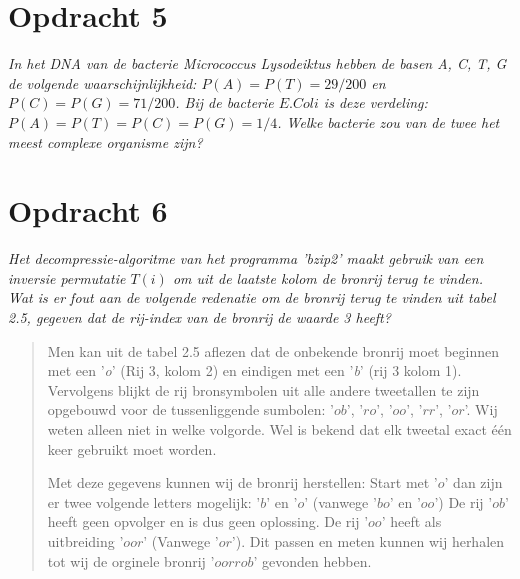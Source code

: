 \section{Opdracht 5}
\emph{In het DNA van de bacterie \emph{Micrococcus Lysodeiktus} hebben de basen \emph{A, C, T, G} de volgende waarschijnlijkheid: $P(A)=P(T)=29/200$ en $P(C)=P(G)=71/200$. Bij de bacterie $E. Coli$ is deze verdeling: $P(A)=P(T)=P(C)=P(G)=1/4$. Welke bacterie zou van de twee het meest complexe organisme zijn?}

\section{Opdracht 6}
\emph{Het decompressie-algoritme van het programma '\emph{bzip2}' maakt gebruik van een inversie permutatie $T(i)$ om uit de laatste kolom de bronrij terug te vinden. Wat is er fout aan de volgende redenatie om de bronrij terug te vinden uit tabel 2.5, gegeven dat de rij-index van de bronrij de waarde 3 heeft?}

\begin{quote}
Men kan uit de tabel 2.5 aflezen dat de onbekende bronrij moet beginnen met een '\emph{o}' (Rij 3, kolom 2) en eindigen met een '\emph{b}' (rij 3 kolom 1). Vervolgens blijkt de rij bronsymbolen uit alle andere tweetallen te zijn opgebouwd voor de tussenliggende sumbolen: '$ob$', '$ro$', '$oo$', '$rr$', '$or$'. Wij weten alleen niet in welke volgorde. Wel is bekend dat elk tweetal exact \'{e}\'{e}n keer gebruikt moet worden.

Met deze gegevens kunnen wij de bronrij herstellen: Start met '$o$' dan zijn er twee volgende letters mogelijk: '$b$' en '$o$' (vanwege '$bo$' en '$oo$') De rij '$ob$' heeft geen opvolger en is dus geen oplossing. De rij '$oo$' heeft als uitbreiding '$oor$' (Vanwege '$or$'). Dit passen en meten kunnen wij herhalen tot wij de orginele bronrij '$oorrob$' gevonden hebben.
\end{quote}
